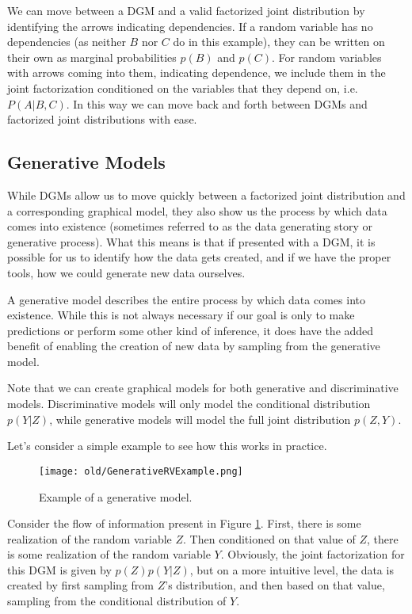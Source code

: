 We can move between a DGM and a valid factorized joint distribution by identifying the arrows indicating dependencies. If a random variable has no dependencies (as neither $B$ nor $C$ do in this example), they can be written on their own as marginal probabilities $p(B)$ and $p(C)$. For random variables with arrows coming into them, indicating dependence, we include them in the joint factorization conditioned on the variables that they depend on, i.e. $P(A | B, C)$. In this way we can move back and forth between DGMs and factorized joint distributions with ease.

\subsection{Generative Models}
While DGMs allow us to move quickly between a factorized joint distribution and a corresponding graphical model, they also show us the process by which data comes into existence (sometimes referred to as the data generating story or generative process). What this means is that if presented with a DGM, it is possible for us to identify how the data gets created, and if we have the proper tools, how we could generate new data ourselves.

\begin{definition}
    A generative model describes the entire process by which data comes into existence. While this is not always necessary if our goal is only to make predictions or perform some other kind of inference, it does have the added benefit of enabling the creation of new data by sampling from the generative model.
\end{definition}

\begin{warning}
    Note that we can create graphical models for both generative and discriminative models. Discriminative models will only model the conditional distribution $p(Y|Z)$, while generative models will model the full joint distribution $p(Z, Y)$.
\end{warning}

Let's consider a simple example to see how this works in practice.
\begin{figure}
    \centering
    \texttt{[image: old/GenerativeRVExample.png]}
    \caption{Example of a generative model.}
    \label{fig:generative-rv}
\end{figure}
Consider the flow of information present in Figure \ref{fig:generative-rv}. First, there is some realization of the random variable $Z$. Then conditioned on that value of $Z$, there is some realization of the random variable $Y$. Obviously, the joint factorization for this DGM is given by $p(Z)p(Y|Z)$, but on a more intuitive level, the data is created by first sampling from $Z$'s distribution, and then based on that value, sampling from the conditional distribution of $Y$.

